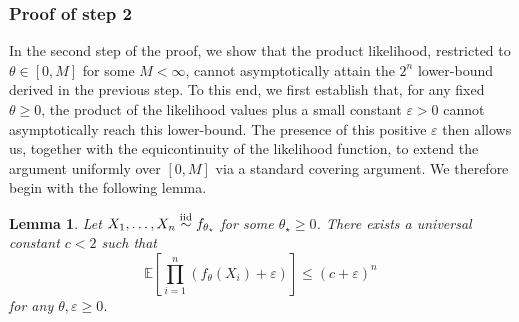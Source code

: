 \documentclass[11pt,twoside]{article}
\newcommand{\iid}{\overset{\textnormal{iid}}{\sim}}
\newtheorem{lemma}{Lemma}
\def\EE{\mathbb{E}}
\begin{document}
\subsubsection*{Proof of step 2}

In the second step of the proof, we show that the product likelihood, restricted to $\theta \in [0, M]$ for some $M < \infty$, cannot asymptotically attain the $2^n$ lower-bound derived in the previous step. To this end, we first establish that, for any fixed $\theta \geq 0$, the product of the likelihood values plus a small constant $\varepsilon > 0$ cannot asymptotically reach this lower-bound. The presence of this positive $\varepsilon$ then allows us, together with the equicontinuity of the likelihood function, to extend the argument uniformly over $[0, M]$ via a standard covering argument. We therefore begin with the following lemma.


\begin{lemma}\label{lem:upperbound_prod_likelihood}
    Let $X_1, \dots, X_n\iid f_{\theta_\star}$ for some $\theta_\star\geq 0$. There exists a universal constant $c< 2$ such that
    \begin{equation*}
        \EE\left[\prod_{i=1}^n (f_\theta(X_i)+ \varepsilon)\right] \leq (c+\varepsilon)^n
    \end{equation*}
    for any $\theta, \varepsilon\geq 0$.
\end{lemma}
\end{document}
